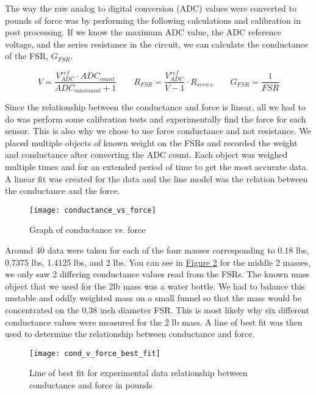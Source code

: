 The way the raw analog to digital conversion (ADC) values were converted to pounds of force was by performing the following calculations and calibration in post processing.
If we know the maximum ADC value, the ADC reference voltage, and the series resistance in the circuit, we can calculate the conductance of the FSR, $G_{FSR}$.

\begin{equation}
  V=\frac{V^{ref}_{ADC}\cdot ADC_{count}}{ADC_{max count}+1}\qquad R_{FSR}=\frac{V^{ref}_{ADC}}{V-1}\cdot R_{series}\qquad G_{FSR}=\frac{1}{FSR}\label{eq:x adc convert}
\end{equation}

Since the relationship between the conductance and force is linear, all we had to do was perform some calibration tests and experimentally find the force for each sensor.
This is also why we chose to use force conductance and not resistance.
We placed multiple objects of known weight on the FSRs and recorded the weight and conductance after converting the ADC count.
Each object was weighed multiple times and for an extended period of time to get the most accurate data.
A linear fit was created for the data and the line model was the relation between the conductance and the force.\par

\begin{figure}[h]
  \centering
  \texttt{[image: conductance\_vs\_force]}
  \caption[Conductance vs. force]{Graph of conductance vs. force \parencite{tekscan-convert}}
  \label{fig:x cond v f}
\end{figure}

Around 40 data were taken for each of the four masses corresponding to 0.18 lbs, 0.7375 lbs, 1.4125 lbs, and 2 lbs.
You can see in \hyperref[{fig:x best fit}]{Figure \ref*{fig:x best fit}} for the middle 2 masses, we only saw 2 differing conductance values read from the FSRs.
The known mass object that we used for the 2lb mass was a water bottle.
We had to balance this unstable and oddly weighted mass on a small funnel so that the mass would be concentrated on the 0.38 inch diameter FSR.
This is most likely why six different conductance values were measured for the 2 lb mass.
A line of best fit was then used to determine the relationship between conductance and force.\par

\begin{figure}[h]
  \centering
  \texttt{[image: cond\_v\_force\_best\_fit]}
  \caption[Conductance vs. force best-fit line]{Line of best fit for experimental data relationship between conductance and force in pounds}
  \label{fig:x best fit}
\end{figure}

